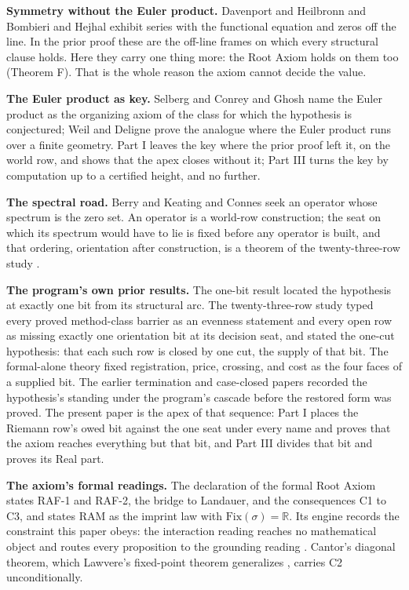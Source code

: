 \documentclass[10pt]{article}
\begin{document}
\textbf{Symmetry without the Euler product.} Davenport and Heilbronn
\cite{davenport1936} and Bombieri and Hejhal \cite{bombieri1995} exhibit
series with the functional equation and zeros off the line. In the prior
proof these are the off-line frames on which every structural clause
holds. Here they carry one thing more: the Root Axiom holds on them too
(Theorem F). That is the whole reason the axiom cannot decide the value.

\textbf{The Euler product as key.} Selberg \cite{selberg1992} and Conrey
and Ghosh \cite{conrey1993} name the Euler product as the organizing
axiom of the class for which the hypothesis is conjectured; Weil
\cite{weil1948} and Deligne \cite{deligne1974} prove the analogue where
the Euler product runs over a finite geometry. Part I leaves the key
where the prior proof left it, on the world row, and shows that the apex
closes without it; Part III turns the key by computation up to a
certified height, and no further.

\textbf{The spectral road.} Berry and Keating \cite{berry1999} and
Connes \cite{connes1999} seek an operator whose spectrum is the zero
set. An operator is a world-row construction; the seat on which its
spectrum would have to lie is fixed before any operator is built, and
that ordering, orientation after construction, is a theorem of the
twenty-three-row study \cite{islamrows}.

\textbf{The program's own prior results.} The one-bit result
\cite{islamonebit} located the hypothesis at exactly one bit from its
structural arc. The twenty-three-row study \cite{islamrows} typed every
proved method-class barrier as an evenness statement and every open row
as missing exactly one orientation bit at its decision seat, and stated
the one-cut hypothesis: that each such row is closed by one cut, the
supply of that bit. The formal-alone theory \cite{islamftoe} fixed
registration, price, crossing, and cost as the four faces of a supplied
bit. The earlier termination and case-closed papers
\cite{islamterm, islamclosed} recorded the hypothesis's standing under
the program's cascade before the restored form was proved. The present
paper is the apex of that sequence: Part I places the Riemann row's owed
bit against the one seat under every name and proves that the axiom
reaches everything but that bit, and Part III divides that bit and
proves its Real part.

\textbf{The axiom's formal readings.} The declaration of the formal Root
Axiom \cite{islamraf} states RAF-1 and RAF-2, the bridge to Landauer,
and the consequences C1 to C3, and states RAM as the imprint law with
\(\mathrm{Fix}(\sigma) = \mathbb{R}\). Its engine records the constraint
this paper obeys: the interaction reading reaches no mathematical object
and routes every proposition to the grounding reading \cite{islamfae}.
Cantor's diagonal theorem, which Lawvere's fixed-point theorem
generalizes \cite{lawvere1969}, carries C2 unconditionally.
\end{document}

